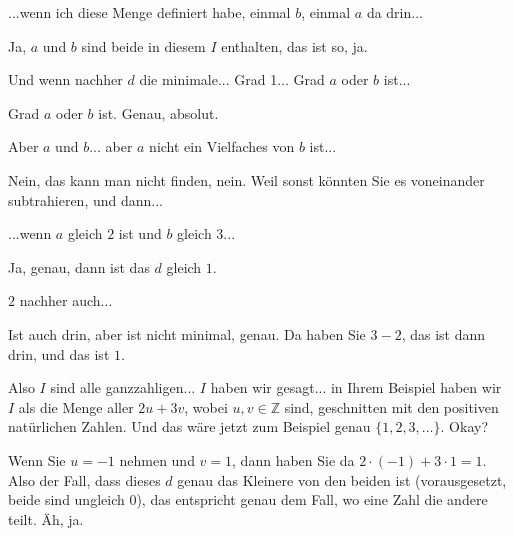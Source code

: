 \begin{student-interaction}[Studentenfrage]
...wenn ich diese Menge definiert habe, einmal $b$, einmal $a$ da drin...
\end{student-interaction}

\begin{spoken-clean}[00:26:09 - 00:26:19]
Ja, $a$ und $b$ sind beide in diesem $I$ enthalten, das ist so, ja.
\end{spoken-clean}

\begin{student-interaction}[Studentenfrage]
Und wenn nachher $d$ die minimale... Grad 1... Grad $a$ oder $b$ ist...
\end{student-interaction}

\begin{spoken-clean}[00:26:21 - 00:26:25]
Grad $a$ oder $b$ ist. Genau, absolut.
\end{spoken-clean}

\begin{student-interaction}[Studentenfrage]
Aber $a$ und $b$... aber $a$ nicht ein Vielfaches von $b$ ist...
\end{student-interaction}

\begin{spoken-clean}[00:26:26 - 00:26:36]
Nein, das kann man nicht finden, nein.  Weil sonst könnten Sie es voneinander subtrahieren, und dann...
\end{spoken-clean}

\begin{student-interaction}[Studentenfrage]
...wenn $a$ gleich $2$ ist und $b$ gleich $3$...
\end{student-interaction}

\begin{spoken-clean}[00:26:37 - 00:26:40]
Ja, genau, dann ist das $d$ gleich $1$.
\end{spoken-clean}

\begin{student-interaction}[Studentenfrage]
$2$ nachher auch...
\end{student-interaction}

\begin{spoken-clean}[00:26:41 - 00:27:34]
Ist auch drin, aber ist nicht minimal, genau. Da haben Sie $3 - 2$, das ist dann drin, und das ist $1$.

Also $I$ sind alle ganzzahligen... $I$ haben wir gesagt... in Ihrem Beispiel haben wir $I$ als die Menge aller $2u + 3v$, wobei $u, v \in \mathbb{Z}$ sind, geschnitten mit den positiven natürlichen Zahlen. Und das wäre jetzt zum Beispiel genau $\{1, 2, 3, \dots\}$. Okay?

Wenn Sie $u = -1$ nehmen und $v = 1$, dann haben Sie da $2 \cdot (-1) + 3 \cdot 1 = 1$. Also der Fall, dass dieses $d$ genau das Kleinere von den beiden ist (vorausgesetzt, beide sind ungleich $0$), das entspricht genau dem Fall, wo eine Zahl die andere teilt. Äh, ja.
\end{spoken-clean}


